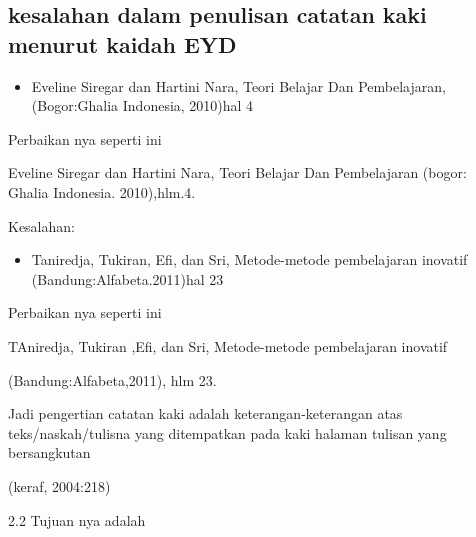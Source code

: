 \begin{itemize}
\subsection{kesalahan dalam penulisan catatan kaki menurut kaidah EYD}
\begin{itemize}
	
	\vspace{\baselineskip}
	\item Eveline Siregar dan Hartini Nara, Teori Belajar Dan Pembelajaran, (Bogor:Ghalia Indonesia, 2010)hal 4
\end{itemize} 

\vspace{\baselineskip}
Perbaikan nya seperti ini\par

\vspace{\baselineskip}
Eveline Siregar dan Hartini Nara, Teori Belajar Dan Pembelajaran (bogor: Ghalia Indonesia. 2010),hlm.4.\par

\vspace{\baselineskip}
Kesalahan:\par
\begin{itemize}
	\vspace{\baselineskip}
	\item Taniredja, Tukiran, Efi, dan Sri, Metode-metode pembelajaran inovatif (Bandung:Alfabeta.2011)hal 23
\end{itemize}

\vspace{\baselineskip}
Perbaikan nya seperti ini\par

\vspace{\baselineskip}
TAniredja, Tukiran ,Efi, dan Sri, Metode-metode pembelajaran inovatif\par

(Bandung:Alfabeta,2011), hlm 23.\par

\vspace{\baselineskip}
Jadi pengertian catatan kaki adalah keterangan-keterangan atas teks/naskah/tulisna yang ditempatkan pada kaki halaman tulisan yang bersangkutan\par

(keraf, 2004:218)\par

\vspace{\baselineskip}
2.2 Tujuan nya adalah\par


\end{itemize}
